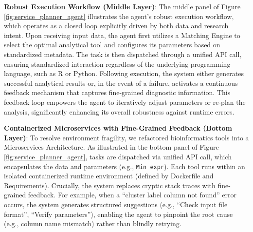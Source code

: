 \documentclass[11pt,a4paper]{article}
\begin{document}
\textbf{Robust Execution Workflow (Middle Layer)}: 
The middle panel of Figure \ref{fig:service_planner_agent} illustrates the agent's robust execution workflow, which operates as a closed loop explicitly driven by both data and research intent. Upon receiving input data, the agent first utilizes a Matching Engine to select the optimal analytical tool and configures its parameters based on standardized metadata. The task is then dispatched through a unified API call, ensuring standardized interaction regardless of the underlying programming language, such as R or Python. Following execution, the system either generates successful analytical results or, in the event of a failure, activates a continuous feedback mechanism that captures fine-grained diagnostic information. This feedback loop empowers the agent to iteratively adjust parameters or re-plan the analysis, significantly enhancing its overall robustness against runtime errors.


\textbf{Containerized Microservices with Fine-Grained Feedback (Bottom Layer)}:
To resolve environment fragility, we refactored bioinformatics tools into a Microservices Architecture. As illustrated in the bottom panel of Figure \ref{fig:service_planner_agent}, tasks are dispatched via unified API call, which encapsulates the data and parameters (e.g., \texttt{Min expr}). Each tool runs within an isolated containerized runtime environment (defined by Dockerfile and Requirements). Crucially, the system replaces cryptic stack traces with fine-grained feedback. For example, when a ``cluster label column not found'' error occurs, the system generates structured suggestions (e.g., ``Check input file format'', ``Verify parameters''), enabling the agent to pinpoint the root cause (e.g., column name mismatch) rather than blindly retrying.
\end{document}
